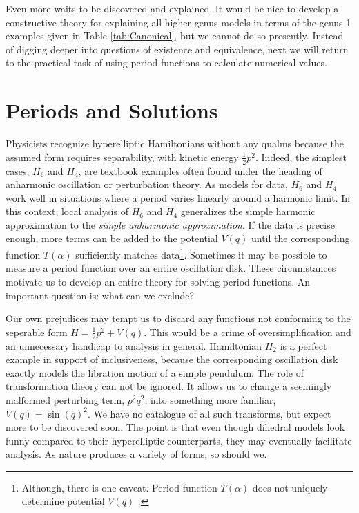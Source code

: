 \documentclass[nofootinbib,preprint]{revtex4-1}
\begin{document}
Even more waits to be discovered and explained. It would be nice to develop 
a constructive theory for explaining all higher-genus models in terms of the genus 1 
examples given in Table \ref{tab:Canonical}, but we cannot do so presently. Instead of 
digging deeper into questions of existence and equivalence, next we will return to the 
practical task of using period functions to calculate numerical values. 

\section{Periods and Solutions}
Physicists recognize hyperelliptic Hamiltonians without any qualms because the assumed 
form requires separability, with kinetic energy $\frac{1}{2}p^2$. Indeed, 
the simplest cases, $H_6$ and $H_4$, are textbook examples often found under the heading
of anharmonic oscillation or perturbation theory\cite{LL1960}. As models for data, $H_6$ and $H_4$
work well in situations where a period varies linearly around a harmonic limit. In this
context, local analysis of $H_6$ and $H_4$ generalizes the simple harmonic approximation 
to the \textit{simple anharmonic approximation}. If the data is precise enough, more terms 
can be added to the potential $V(q)$ until the corresponding function $T(\alpha)$ sufficiently 
matches data\footnote{Although, there is one caveat. Period function $T(\alpha)$ does not 
uniquely determine potential $V(q)$ \cite{LL1960}.}. Sometimes it may be possible to measure a period 
function over an entire oscillation disk. These circumstances motivate us to develop an entire 
theory for solving period functions. An important question is: what can we exclude?

Our own prejudices may tempt us to discard any functions not conforming to the seperable 
form $H=\frac{1}{2}p^2 + V(q)$. This would be a crime of oversimplification and an unnecessary 
handicap to analysis in general. Hamiltonian $H_2$ is a perfect example in support of inclusiveness,
because the corresponding oscillation disk exactly models the libration motion of a simple pendulum.
The role of transformation theory can not be ignored. It allows us to change a seemingly 
malformed perturbing term, $p^2 q^2$, into something more familiar, $V(q)=\sin(q)^2$. We have 
no catalogue of all such transforms, but expect more to be discovered soon. The point is that 
even though dihedral models look funny compared to their hyperelliptic counterparts, they may 
eventually facilitate analysis. As nature produces a variety of forms, so should we.
\end{document}

